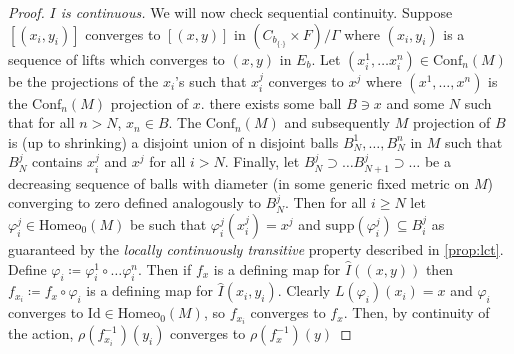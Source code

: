 \documentclass[10pt, oneside]{article}
\newcommand{\homeo}[1][S^1]{\text{Homeo}_0(#1)}
\newcommand{\conf}[2][S^1]{\text{Conf}_{#2}(#1)}
\newcommand{\set}{{\{\cdot\}}}
\newcommand{\maxcov}{C_{b_\set}}
\theoremstyle{definition}
\theoremstyle{definition}
\begin{document}
\begin{proof}
    \medskip
    {\it $I$ is continuous.} We will now check sequential continuity. Suppose $[(x_i, y_i)]$ converges to $[(x, y)]$ in $(\maxcov\times F)/\Gamma$ where $(x_i, y_i)$ is a sequence of lifts which converges to $(x,y)$ in $E_b$. Let $(x_i^1,\dots x_i^n)\in\conf[M]{n}$ be the projections of the $x_i$'s such that $x_i^j$ converges to $x^j$ where $(x^1,\dots, x^n)$ is the $\conf[M]{n}$ projection of $x$. there exists some ball $B\ni x$ and some $N$ such that for all $n> N$, $x_n\in B$. The $\conf[M]{n}$ and subsequently $M$ projection of $B$ is (up to shrinking) a disjoint union of n disjoint balls $B_N^1,\dots,B_N^n$ in $M$ such that $B_N^j$ contains $x_i^j$ and $x^j$ for all $i>N$. Finally, let $B_N^j\supset\dots B_{N+1}^j\supset\dots$ be a decreasing sequence of balls with diameter (in some generic fixed metric on $M$) converging to zero defined analogously to $B_N^j$. Then for all $i\geq N$ let $\varphi_i^j\in\homeo[M]$ be such that $\varphi_i^j(x_i^j)=x^j$ and $\text{supp}(\varphi_i^j)\subseteq B_i^j$ as guaranteed by the {\it locally continuously transitive} property described in \cref{prop:lct}. Define $\varphi_i \coloneqq \varphi^1_i\circ\dots\varphi^n_i$. Then if $f_x$ is a defining map for $\hat{I}((x, y))$ then $f_{x_i}\coloneqq f_x\circ\varphi_i$ is a defining map for $\hat{I}(x_i, y_i)$. Clearly $L(\varphi_i)(x_i) = x$ and $\varphi_i$ converges to $\text{Id}\in\homeo[M]$, so $f_{x_i}$ converges to $f_x$. Then, by continuity of the action, $\rho(f_{x_i}^{-1})(y_i)$ converges to $\rho(f_x^{-1})(y)$


\end{proof}
\end{document}
